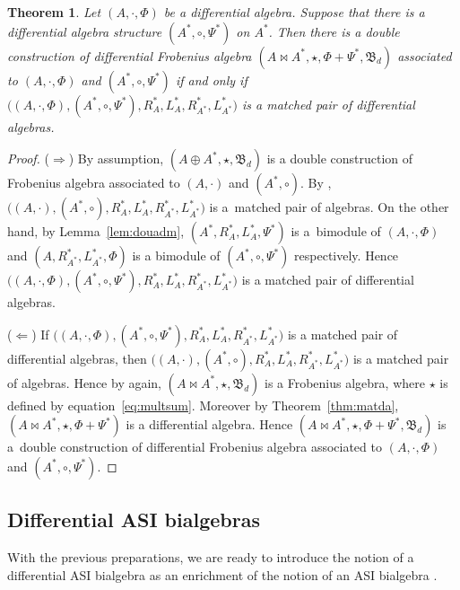 \documentclass[10pt,a4paper]{amsart}
\numberwithin{equation}{section}
\newtheorem{Theorem}{Theorem}[section]
\begin{document}
\begin{Theorem}\label{thm:doumat}
 Let $(A, \cdot, \Phi)$ be a differential algebra.
 Suppose that there is a differential algebra structure $(A^*, \circ, \Psi^*)$ on $A^*$.
 Then there is a double construction of differential Frobenius algebra
 $(A \bowtie A^*, \star, \Phi + \Psi^*, \mathfrak{B}_d)$ associated to $(A, \cdot, \Phi)$ and $(A^*, \circ, \Psi^*)$ if and only if
 $\big((A, \cdot, \Phi), (A^*, \circ, \Psi^*), R^*_A, L^*_A, R^*_{A^*}, L^*_{A^*}\big)$ is a matched pair of differential algebras.
\end{Theorem}
\begin{proof}
 ($\Longrightarrow$)
 By assumption, $(A \oplus A^*, \star, \mathfrak{B}_d)$ is a double construction of Frobenius algebra associated to $(A,\cdot)$ and $(A^*, \circ)$.
 By \cite[Theorem~2.2.1]{BaiDouble}, $\big((A, \cdot), (A^*, \circ), R^*_A, L^*_A, R^*_{A^*}, L^*_{A^*}\big)$ is a~matched pair of algebras.
 On the other hand, by Lemma~\ref{lem:douadm}, $(A^*, R^*_A, L^*_A, \Psi^*)$ is a~bimodule of $(A, \cdot, \Phi)$ and
 $(A, R^*_{A^*}, L^*_{A^*}, \Phi)$ is a bimodule of $(A^*, \circ, \Psi^*)$ respectively.
 Hence $\big((A, \cdot, \Phi),\allowbreak (A^*, \circ, \Psi^*),R^*_A, L^*_A, R^*_{A^*}, L^*_{A^*}\big)$ is a matched pair of differential algebras.

 ($\Longleftarrow$)
 If $\big((A, \cdot, \Phi), (A^*, \circ, \Psi^*), R^*_A, L^*_A, R^*_{A^*}, L^*_{A^*}\big)$ is a matched pair of differential algebras,
 then $\big((A, \cdot), (A^*, \circ), R^*_A, L^*_A, R^*_{A^*}, L^*_{A^*}\big)$ is a matched pair of algebras.
 Hence by \cite[Theorem~2.2.1]{BaiDouble} again,
 $(A \bowtie A^*, \star, \mathfrak{B}_d)$ is a Frobenius algebra, where $\star$ is defined by equation~\eqref{eq:multsum}.
 Moreover by Theorem~\ref{thm:matda},
 $(A \bowtie A^*, \star, \Phi + \Psi^*)$ is a differential algebra.
 Hence $(A \bowtie A^*, \star, \Phi + \Psi^*, \mathfrak{B}_d)$ is a~double construction of differential Frobenius algebra associated to $(A, \cdot, \Phi)$ and $(A^*, \circ, \Psi^*)$.
\end{proof}

\subsection{Differential ASI bialgebras}\label{subsec:dasi}
With the previous preparations, we are ready to introduce the
notion of a differential ASI bialgebra as an enrichment of the
notion of an ASI bialgebra \cite{AguiarOn, BaiDouble, joni1979coalgebras, zhelyabian1997jordan}.
\end{document}
